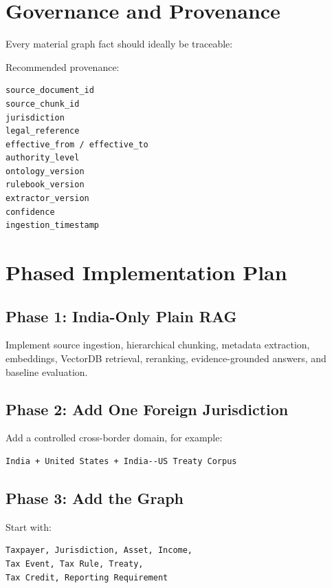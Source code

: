 \documentclass[11pt,a4paper]{article}
\begin{document}
\section{Governance and Provenance}
Every material graph fact should ideally be traceable:
\begin{center}
\end{center}
Recommended provenance:
\begin{lstlisting}
source_document_id
source_chunk_id
jurisdiction
legal_reference
effective_from / effective_to
authority_level
ontology_version
rulebook_version
extractor_version
confidence
ingestion_timestamp
\end{lstlisting}

\section{Phased Implementation Plan}
\subsection{Phase 1: India-Only Plain RAG}
Implement source ingestion, hierarchical chunking, metadata extraction, embeddings, VectorDB retrieval, reranking, evidence-grounded answers, and baseline evaluation.

\subsection{Phase 2: Add One Foreign Jurisdiction}
Add a controlled cross-border domain, for example:
\begin{lstlisting}
India + United States + India--US Treaty Corpus
\end{lstlisting}

\subsection{Phase 3: Add the Graph}
Start with:
\begin{lstlisting}
Taxpayer, Jurisdiction, Asset, Income,
Tax Event, Tax Rule, Treaty,
Tax Credit, Reporting Requirement
\end{lstlisting}
\end{document}
